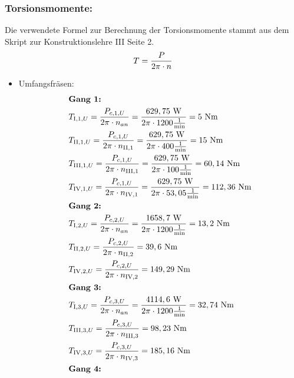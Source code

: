 \subsubsection{Torsionsmomente:}
Die verwendete Formel zur Berechnung der Torsionsmomente stammt aus dem Skript zur Konstruktionslehre III Seite 2.
\[
	T=\frac{P}{2 \pi \cdot n}
\]
\begin{itemize}
\item {Umfangsfräsen: }
\begin{align*}
	&\textbf{Gang 1: } \\
	&T_{\mathord{\mathrm{I}},1,U} = \frac{P_{c,1,U}}{2 \pi \x n_{an}} = \frac{629,75 \text{ W} }{2 \pi \x 1200 \frac{1}{\text{min}}} = 5 \text{ Nm} \\
	&T_{\mathord{\mathrm{II}},1,U} = \frac{P_{c,1,U}}{2 \pi \x n_{\mathord{\mathrm{II}},1}} = \frac{629,75 \text{ W} }{2 \pi \x 400 \frac{1}{\text{min}}} = 15 \text{ Nm} \\
	&T_{\mathord{\mathrm{III}},1,U} = \frac{P_{c,1,U}}{2 \pi \x n_{\mathord{\mathrm{III}},1}} = \frac{629,75 \text{ W} }{2 \pi \x 100 \frac{1}{\text{min}}} = 60,14 \text{ Nm} \\
	&T_{\mathord{\mathrm{IV}},1,U} = \frac{P_{c,1,U}}{2 \pi \x n_{\mathord{\mathrm{IV}},1}} = \frac{629,75 \text{ W} }{2 \pi \x 53,05 \frac{1}{\text{min}}} =112,36 \text{ Nm} \\
	&\textbf{Gang 2: } \\
	&T_{\mathord{\mathrm{I}},2,U} = \frac{P_{c,2,U}}{2 \pi \x n_{an}} = \frac{1658,7 \text{ W} }{2 \pi \x 1200 \frac{1}{\text{min}}} = 13,2 \text{ Nm} \\
	&T_{\mathord{\mathrm{II}},2,U} = \frac{P_{c,2,U}}{2 \pi \x n_{\mathord{\mathrm{II}},2}} = 39,6 \text{ Nm} \\
	&T_{\mathord{\mathrm{IV}},2,U} = \frac{P_{c,2,U}}{2 \pi \x n_{\mathord{\mathrm{IV}},2}} = 149,29 \text{ Nm} \\
	&\textbf{Gang 3: } \\
	&T_{\mathord{\mathrm{I}},3,U} = \frac{P_{c,3,U}}{2 \pi \x n_{an}} = \frac{4114,6 \text{ W} }{2 \pi \x 1200 \frac{1}{\text{min}}} = 32,74 \text{ Nm} \\
	&T_{\mathord{\mathrm{III}},3,U} = \frac{P_{c,3,U}}{2 \pi \x n_{\mathord{\mathrm{III}},3}} = 98,23 \text{ Nm} \\
	&T_{\mathord{\mathrm{IV}},3,U} = \frac{P_{c,3,U}}{2 \pi \x n_{\mathord{\mathrm{IV}},3}} = 185,16 \text{ Nm} \\
	&\textbf{Gang 4: } \\

\end{align*}
\end{itemize}
